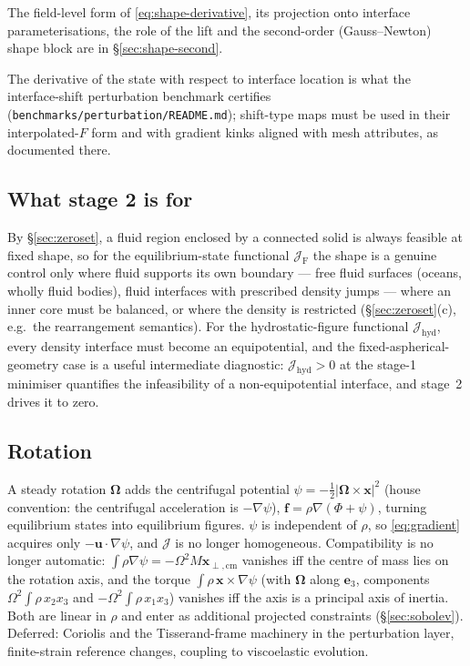 \documentclass[11pt]{article}
\newcommand{\Jf}{\mathscr{J}}  %
\newcommand{\bu}{\mathbf{u}}
\newcommand{\bx}{\mathbf{x}}
\newcommand{\bff}{\mathbf{f}}
\newcommand{\JF}{\Jf _{\mathrm{F}}}
\newcommand{\Jh}{\Jf _{\mathrm{hyd}}}
\begin{document}
The field-level form of \eqref{eq:shape-derivative}, its projection onto
interface parameterisations, the role of the lift and the second-order
(Gauss--Newton) shape block are in \S\ref{sec:shape-second}.

The derivative of the state with respect to interface location is what
the interface-shift perturbation benchmark certifies
(\texttt{benchmarks/perturbation/README.md}); shift-type maps must be
used in their interpolated-$F$ form and with gradient kinks aligned with
mesh attributes, as documented there.

\subsection{What stage 2 is for}

By \S\ref{sec:zeroset}, a fluid region enclosed by a connected solid is
always feasible at fixed shape, so for the equilibrium-state functional
$\JF$ the shape is a genuine control only where fluid supports its own
boundary --- free fluid surfaces (oceans, wholly fluid bodies), fluid
interfaces with prescribed density jumps --- where an inner core must be
balanced, or where the density is restricted (\S\ref{sec:zeroset}(c),
e.g.\ the rearrangement semantics). For the hydrostatic-figure functional
$\Jh$, every density interface must become an equipotential, and the
fixed-aspherical-geometry case is a useful intermediate diagnostic:
$\Jh > 0$ at the stage-1 minimiser quantifies the infeasibility of a
non-equipotential interface, and stage~2 drives it to zero.

\subsection{Rotation}
\label{sec:rotation}

A steady rotation $\bm{\Omega}$ adds the centrifugal potential
$\psi = -\tfrac12|\bm{\Omega}\times\bx|^2$ (house convention: the
centrifugal acceleration is $-\nabla\psi$), $\bff = \rho\nabla(\Phi+\psi)$,
turning equilibrium states into equilibrium figures. $\psi$ is
independent of $\rho$, so \eqref{eq:gradient} acquires only
$-\bu\cdot\nabla\psi$, and $\Jf $ is no longer homogeneous. Compatibility is
no longer automatic: $\int\rho\nabla\psi = -\Omega^2 M\bx_{\perp,\mathrm{cm}}$
vanishes iff the centre of mass lies on the rotation axis, and the
torque $\int\rho\,\bx\times\nabla\psi$ (with $\bm{\Omega}$ along
$\mathbf{e}_3$, components $\Omega^2\int\rho\,x_2x_3$ and
$-\Omega^2\int\rho\,x_1x_3$) vanishes iff the axis is a principal axis of
inertia. Both are linear in $\rho$ and enter as additional projected
constraints (\S\ref{sec:sobolev}). Deferred: Coriolis and the
Tisserand-frame machinery in the perturbation layer, finite-strain
reference changes, coupling to viscoelastic evolution.
\end{document}

